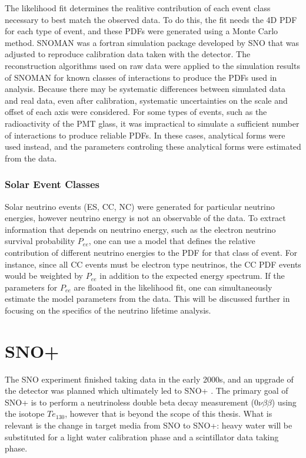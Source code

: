 The likelihood fit determines the realitive contribution of each event class necessary to best match the observed data.
To do this, the fit needs the 4D PDF for each type of event, and these PDFs were generated using a Monte Carlo method.
SNOMAN \cite{sno_nim} was a fortran simulation package developed by SNO that was adjusted to reproduce calibration data taken with the detector.
The reconstruction algorithms used on raw data were applied to the simulation results of SNOMAN for known classes of interactions to produce the PDFs used in analysis.
Because there may be systematic differences between simulated data and real data, even after calibration, systematic uncertainties on the scale and offset of each axis were considered.
For some types of events, such as the radioactivity of the PMT glass, it was impractical to simulate a sufficient number of interactions to produce reliable PDFs.
In these cases, analytical forms were used instead, and the parameters controling these analytical forms were estimated from the data.

\subsubsection{Solar Event Classes}

Solar neutrino events (ES, CC, NC) were generated for particular neutrino energies, however neutrino energy is not an observable of the data.
To extract information that depends on neutrino energy, such as the electron neutrino survival probability $P_{ee}$, one can use a model that defines the relative contribution of different neutrino energies to the PDF for that class of event.
For instance, since all CC events must be electron type neutrinos, the CC PDF events would be weighted by $P_{ee}$ in addition to the expected energy spectrum. 
If the parameters for $P_{ee}$ are floated in the likelihood fit, one can simultaneously estimate the model parameters from the data.
This will be discussed further in  focusing on the specifics of the neutrino lifetime analysis.

\section{SNO+}

The SNO experiment finished taking data in the early 2000s, and an upgrade of the detector was planned which ultimately led to SNO+ \cite{snop}.
The primary goal of SNO+ is to perform a neutrinoless double beta decay measurement (0$\nu\beta\beta$) using the isotope $Te_{130}$, however that is beyond the scope of this thesis.
What is relevant is the change in target media from SNO to SNO+: heavy water will be substituted for a light water calibration phase and a scintillator data taking phase.

